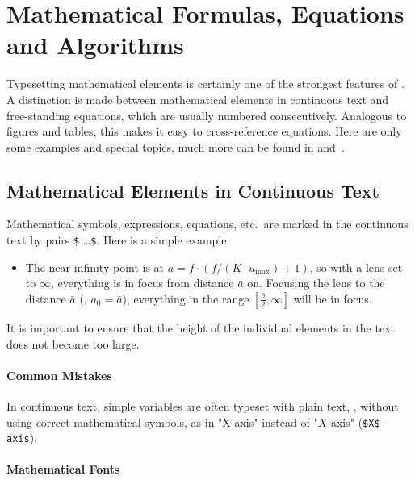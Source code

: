 \chapter[Mathematical Formulas etc.]{Mathematical Formulas, Equations and Algorithms}
\label{cha:Mathematics}


Typesetting mathematical elements is certainly one of the strongest features of
\latex. A distinction is made between mathematical elements in continuous text
and free-standing equations, which are usually numbered consecutively.
Analogous to figures and tables, this makes it easy to cross-reference equations.
Here are only some examples and special topics, much more can be found in 
\cite[Ch.\ 7]{Kopka2003} and~\cite{Voss2014}.


\section{Mathematical Elements in Continuous Text}

Mathematical symbols, expressions, equations, etc.\ are marked in the continuous
text by pairs \verb!$! \ldots \verb!$!. Here is a simple example:
%
\begin{itemize}
	\item[]
	The near infinity point is at $\bar{a} = f \cdot (f / (K \cdot u_{\max}) + 1)$, 
	so with a lens set to $\infty$, everything is in focus from distance $\bar{a}$ on.
	Focusing the lens to the distance $\bar{a}$ (\ie, $a_0 = \bar{a}$), everything
	in the range $[\frac{\bar{a}}{2}, \infty]$ will be in focus.
\end{itemize}
%
It is important to ensure that the height of the individual elements in the text
does not become too large.

\subsubsection{Common Mistakes}

In continuous text, simple variables are often typeset with plain text,
\ie, without using correct mathematical symbols, as in "X-axis" instead of 
"$X$-axis" (\verb!$X$-axis!).


\subsubsection{Mathematical Fonts}

